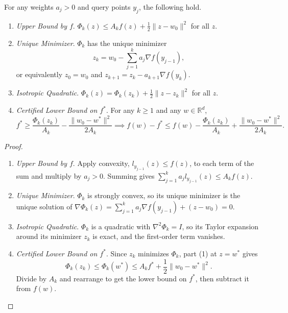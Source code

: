 	\begin{lemma}
		\label{lem:agd-model-properties}
		\label{lem:agd-lower-bound}
		For any weights $a_j > 0$ and query points $y_j$, the following hold. 
		\begin{enumerate}
			\item \textit{Upper Bound by $f$}. $\Phi_k(z) \leq A_k f(z) + \frac{1}{2}\|z - w_0\|^2$ for all $z$.

			\item \textit{Unique Minimizer}. $\Phi_k$ has the unique minimizer
			\begin{equation}
				z_k = w_0 - \sum_{j=1}^k a_j \nabla f(y_{j-1}),
			\end{equation}
			or equivalently $z_0 = w_0$ and $z_{k+1} = z_k - a_{k+1} \nabla f(y_k)$.

			\item \textit{Isotropic Quadratic}. $\Phi_k(z) = \Phi_k(z_k) + \frac{1}{2} \|z - z_k\|^2$ for all $z$. 

			\item \textit{Certified Lower Bound on $f^\ast$}. For any $k \geq 1$ and any $w \in \mathbb{R}^d$,
			\begin{equation}
				f^\ast \geq \frac{\Phi_k(z_k)}{A_k} - \frac{\|w_0 - w^\ast\|^2}{2A_k} \implies f(w) - f^\ast \leq f(w) - \frac{\Phi_k(z_k)}{A_k} + \frac{\|w_0 - w^\ast\|^2}{2A_k}.
			\end{equation}
		\end{enumerate}
	\end{lemma}
	\begin{proof}
		\begin{enumerate}
			\item \textit{Upper Bound by $f$}. Apply convexity, $l_{y_{j-1}}(z) \leq f(z)$, to each term of the sum and multiply by $a_j > 0$. Summing gives $\sum_{j=1}^k a_j l_{y_{j-1}}(z) \leq A_k f(z)$. 

			\item \textit{Unique Minimizer}. $\Phi_k$ is strongly convex, so its unique minimizer is the unique solution of $\nabla \Phi_k(z) = \sum_{j=1}^k a_j \nabla f(y_{j-1}) + (z - w_0) = 0$. 

			\item \textit{Isotropic Quadratic}. $\Phi_k$ is a quadratic with $\nabla^2 \Phi_k = I$, so its Taylor expansion around its minimizer $z_k$ is exact, and the first-order term vanishes. 

			\item \textit{Certified Lower Bound on $f^\ast$}. Since $z_k$ minimizes $\Phi_k$, part (1) at $z = w^\ast$ gives 
			\begin{equation}
				\Phi_k(z_k) \leq \Phi_k(w^\ast) \leq A_k f^\ast + \frac{1}{2}\|w_0 - w^\ast\|^2.
			\end{equation}
			Divide by $A_k$ and rearrange to get the lower bound on $f^\ast$, then subtract it from $f(w)$. 
		\end{enumerate}
	\end{proof}

